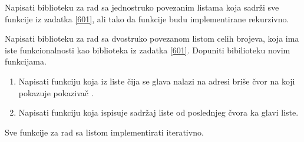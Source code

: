 \begin{Exercise}[label=602]
Napisati biblioteku za rad sa jednostruko povezanim listama koja sadrži sve funkcije iz zadatka \ref{601}, ali tako da funkcije budu implementirane rekurzivno. 
\end{Exercise}
\begin{Answer}[ref=602]
\end{Answer}

\begin{Exercise}[label=603]
Napisati biblioteku za rad sa dvostruko povezanom listom celih brojeva, koja ima iste funkcionalnosti kao biblioteka iz zadatka \ref{601}. 
Dopuniti bibilioteku novim funkcijama.
\begin{enumerate}
 \item Napisati funkciju  koja iz liste čija se glava nalazi na adresi  briše čvor na koji pokazuje pokazivač .
 \item Napisati funkciju  koja ispisuje sadržaj liste od poslednjeg čvora ka glavi liste.
\end{enumerate}

Sve funkcije za rad sa listom implementirati iterativno.
\end{Exercise}
\begin{Answer}[ref=603]
\end{Answer}

